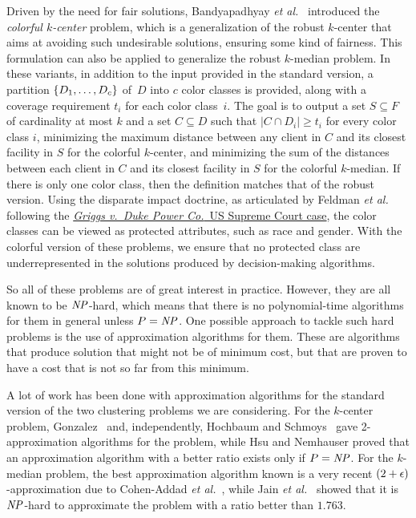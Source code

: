 \documentclass[12pt]{article}
\begin{document}
Driven by the need for fair solutions, Bandyapadhyay \emph{et al.}~\cite{BIPV2019} introduced the \emph{colorful $k$-center} problem, which is a generalization of the robust $k$-center that aims at avoiding such undesirable solutions, ensuring some kind of fairness. This formulation can also be applied to generalize the robust $k$-median problem. 
In these variants, in addition to the input provided in the standard version, a partition $\{D_1,\ldots, D_c\}$ of~$D$ into $c$ color classes is provided, along with a coverage requirement $t_i$ for each color class~$i$. 
The goal is to output a set $S \subseteq F$ of cardinality at most $k$ and a set $C \subseteq D$ such that $|C \cap D_i| \geq t_i$ for every color class $i$, minimizing the maximum distance between any client in $C$ and its closest facility in $S$ for the colorful $k$-center, and minimizing the sum of the distances between each client in $C$ and its closest facility in $S$ for the colorful $k$-median.
If there is only one color class, then the definition matches that of the robust version.
Using the disparate impact doctrine, as articulated by Feldman \emph{et al.}~\cite{FSMSV2015} following the \href{https://en.wikipedia.org/wiki/Griggs_v._Duke_Power_Co.}{\emph{Griggs v.\ Duke Power Co.}\ US Supreme Court case}, the color classes can be viewed as protected attributes, such as race and gender. 
With the colorful version of these problems, we ensure that no protected class are underrepresented in the solutions produced by decision-making algorithms.

So all of these problems are of great interest in practice. However, they are all known to be $\mathit{NP}$-hard, which means that there is no polynomial-time algorithms for them in general unless $P=\mathit{NP}$.  One possible approach to tackle such hard problems is the use of approximation algorithms for them.  These are algorithms that produce solution that might not be of minimum cost, but that are proven to have a cost that is not so far from this minimum. 

A lot of work has been done with approximation algorithms for the standard version of the two clustering problems we are considering.
For the $k$-center problem, Gonzalez~\cite{G1985} and, independently, Hochbaum and Schmoys~\cite{HS1985} gave 2-approximation algorithms for the problem, while Hsu and Nemhauser proved that an approximation algorithm with a better ratio exists only if $P=\mathit{NP}$.
For the $k$-median problem, the best approximation algorithm known is a very recent $(2 + \epsilon)$-approximation due to Cohen-Addad \emph{et al.}~\cite{CGLS2025}, while Jain \emph{et al.}~\cite{JMS2002} showed that it is $\mathit{NP}$-hard to approximate the problem with a ratio better than $1.763$.
\end{document}
